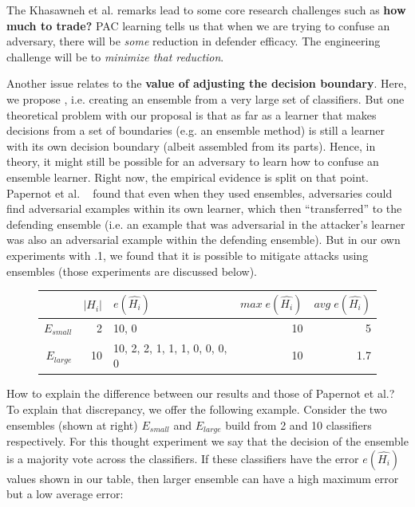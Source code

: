 The Khasawneh et al. remarks   lead to some
core   research challenges
such as   {\bf how much to trade?}
PAC learning tells us that when we are trying to confuse an adversary, there will be {\em some} reduction in defender efficacy. The engineering challenge will be to {\em minimize that reduction}.

Another issue relates to the {\bf value of adjusting the decision boundary}.   Here, we propose   {\IT}, i.e. creating an ensemble
from a very large set of classifiers.
But one theoretical problem with our proposal is that as far as  a learner that makes decisions from a set of boundaries (e.g. an    ensemble method) is still a learner with its own decision boundary (albeit assembled from its parts). Hence, in theory,
it might still be possible for an adversary to learn how to confuse an ensemble learner. 
Right now, the empirical evidence is split on that point. Papernot et al. ~\cite{papernot2016transferability} found that  even  when they used ensembles,     adversaries could     find adversarial examples within its own learner, which then ``transferred'' to the defending ensemble (i.e. an example that was adversarial
in the attacker's learner was also an adversarial example within the defending   ensemble).
But in our own experiments
with {\IT}.1, we found that it is possible to mitigate attacks using ensembles (those experiments are discussed below). 

\begin{figure}
{\em  \footnotesize
 \begin{tabular}{r|r|l|r|r}
  &$|H_i|$ & $e(\hat{H_i})$ & $\mathit{max} \; e(\hat{H_i})$  & $\mathit{avg} \; e(\hat{H_i})$\\\hline
 $E_{\mathit{small}}$ & 2 & 10, 0  & 10& 5\\
  $E_{\mathit{large}}$ & 10 & 10, 2, 2, 1, 1, 1, 0, 0, 0, 0 & 10& 1.7\\
 \end{tabular}}
\end{figure} How to explain the difference between our results and those of  Papernot et al.?
To explain that discrepancy, we offer the following example.
Consider the two ensembles  (shown at right)
 $E_{\mathit{small}}$ and $E_{\mathit{large}}$ build from 2 and 10 classifiers respectively.
 For this thought experiment we say that the decision of the ensemble is a majority vote across
 the classifiers.
If these classifiers have the error $e(\hat{H_i})$ values shown in our   table,
then  larger  ensemble can  have a high maximum error but a low average error: 
 

